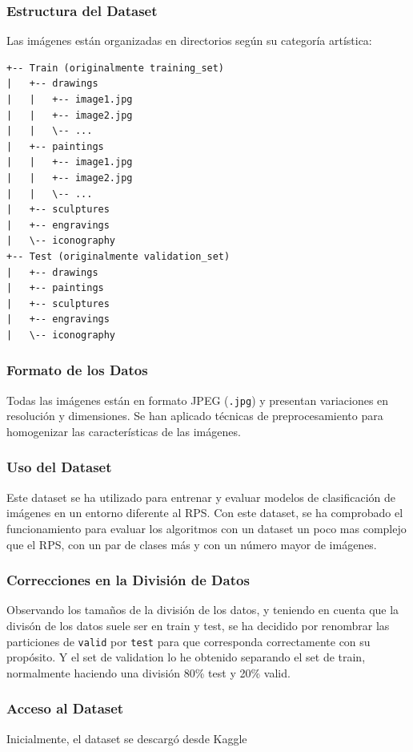 \subsubsection{Estructura del Dataset}
Las imágenes están organizadas en directorios según su categoría artística:
\begin{verbatim}
+-- Train (originalmente training_set)
|   +-- drawings
|   |   +-- image1.jpg
|   |   +-- image2.jpg
|   |   \-- ...
|   +-- paintings
|   |   +-- image1.jpg
|   |   +-- image2.jpg
|   |   \-- ...
|   +-- sculptures
|   +-- engravings
|   \-- iconography
+-- Test (originalmente validation_set)
|   +-- drawings
|   +-- paintings
|   +-- sculptures
|   +-- engravings
|   \-- iconography
\end{verbatim}

\subsubsection{Formato de los Datos}
Todas las imágenes están en formato JPEG (\texttt{.jpg}) y presentan variaciones en resolución y dimensiones.
Se han aplicado técnicas de preprocesamiento para homogenizar las características de las imágenes.

\subsubsection{Uso del Dataset}
Este dataset se ha utilizado para entrenar y evaluar modelos de clasificación de imágenes en un entorno diferente al
RPS\@.
Con este dataset, se ha comprobado el funcionamiento para evaluar los algoritmos con un dataset un poco mas complejo
que el RPS, con un par de clases más y con un número mayor de imágenes.

\subsubsection{Correcciones en la División de Datos}
Observando los tamaños de la división de los datos, y teniendo en cuenta que la divisón de los datos suele ser en train
y test, se ha decidido por renombrar las particiones de \texttt{valid} por \texttt{test} para que corresponda
correctamente con su propósito.
Y el set de validation lo he obtenido separando el set de train, normalmente haciendo una división 80\% test y 20\%
valid.

\subsubsection{Acceso al Dataset}
Inicialmente, el dataset se descargó desde Kaggle~\cite{noauthor_original_nodate}

